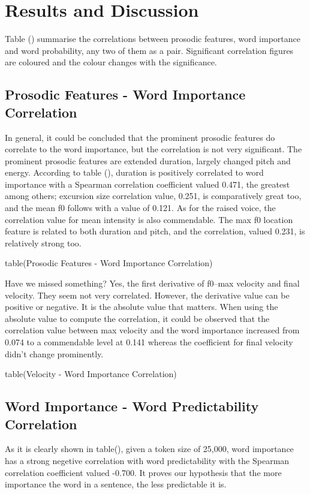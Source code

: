 \chapter{Results and Discussion}

Table () summarise the correlations between prosodic features, word importance and word probability, any two of them as a pair. Significant correlation figures are coloured and the colour changes with the significance. 

\section{Prosodic Features - Word Importance Correlation}

In general, it could be concluded that the prominent prosodic features do correlate to the word importance, but the correlation is not very significant. The prominent prosodic features are extended duration, largely changed pitch and energy. According to table (), duration is positively correlated to word importance with a Spearman correlation coefficient valued 0.471, the greatest among others; excursion size correlation value, 0.251,  is comparatively great too, and the mean f0 follows with a value of 0.121. As for the raised voice, the correlation value for mean intensity is also commendable. The max f0 location feature is related to both duration and pitch, and the correlation, valued 0.231, is relatively strong too.

table(Prosodic Features - Word Importance Correlation)

Have we missed something? Yes, the first derivative of f0--max velocity and final velocity. They seem not very correlated. However, the derivative value can be positive or negative. It is the absolute value that matters. When using the absolute value to compute the correlation, it could be observed that the correlation value between max velocity and the word importance increased from 0.074 to a commendable level at 0.141 whereas the coefficient for final velocity didn't change prominently.

table(Velocity - Word Importance Correlation)

\section{Word Importance - Word Predictability Correlation}
As it is clearly shown in table(), given a token size of 25,000, word importance has a strong negetive correlation with word predictability with the Spearman correlation coefficient valued -0.700. It proves our hypothesis that the more importance the word in a sentence, the less predictable it is. 

